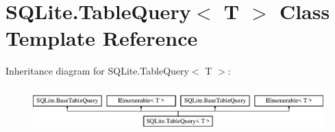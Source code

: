 \hypertarget{classSQLite_1_1TableQuery_3_01T_01_4}{\section{S\-Q\-Lite.\-Table\-Query$<$ T $>$ Class Template Reference}
\label{classSQLite_1_1TableQuery_3_01T_01_4}
}
Inheritance diagram for S\-Q\-Lite.\-Table\-Query$<$ T $>$\-:\begin{figure}[H]
\begin{center}
\leavevmode
\includegraphics[height=1.750000cm]{classSQLite_1_1TableQuery_3_01T_01_4}
\end{center}
\end{figure}
